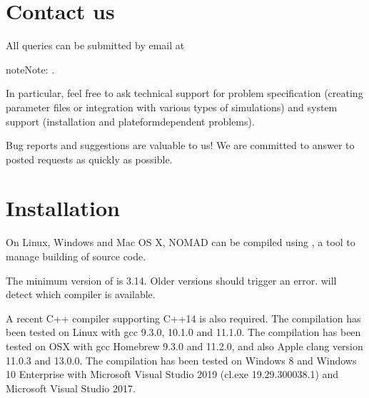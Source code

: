 \documentclass[letterpaper,10pt,english]{sphinxmanual}
\begin{document}
\chapter{Contact us}
\label{\detokenize{Introduction:contact-us}}
\sphinxAtStartPar
All queries can be submitted by email at

\begin{sphinxadmonition}{note}{Note:}
\sphinxAtStartPar
{}.
\end{sphinxadmonition}

\sphinxAtStartPar
In particular, feel free to ask technical support for problem specification
(creating parameter files or integration with various types of simulations) and system support (installation and plateform\sphinxhyphen{}dependent problems).

\sphinxAtStartPar
Bug reports and suggestions are valuable to us! We are committed to answer to posted requests as quickly as possible.

\begin{sphinxShadowBox}
\end{sphinxShadowBox}


\chapter{Installation}
\label{\detokenize{Installation:installation}}\label{\detokenize{Installation:id1}}\label{\detokenize{Installation::doc}}
\sphinxAtStartPar
On Linux, Windows and Mac OS X, NOMAD can be compiled using , a tool to manage building of source code.

\sphinxAtStartPar
The minimum version of  is 3.14. Older versions should trigger an error.  will detect which compiler is available.

\sphinxAtStartPar
A recent C++ compiler supporting C++14 is also required. The compilation has been tested on Linux with gcc 9.3.0, 10.1.0 and 11.1.0. The compilation has been tested on OSX with gcc Homebrew 9.3.0 and 11.2.0, and also Apple clang version 11.0.3 and 13.0.0. The compilation has been tested on Windows 8 and Windows 10 Enterprise with Microsoft Visual Studio 2019 (cl.exe 19.29.300038.1) and Microsoft Visual Studio 2017.
\end{document}
